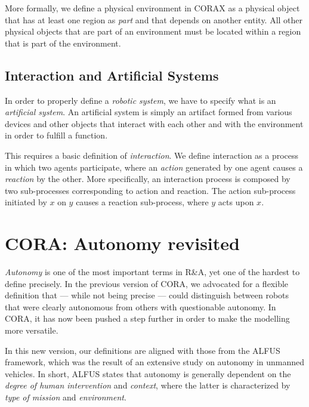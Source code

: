 \documentclass[preprint,12pt]{elsarticle}
\newcommand{\hlc}[2][yellow]{ {\sethlcolor{#1} \hl{#2}} }
\newcommand{\paulo}[1]{{\hlc[cyan]{\textbf{Paulo}: #1}}}
\begin{document}
More formally, we define a physical environment in CORAX as a physical object that has at least one region as \textit{part} and that depends on another entity. All other physical objects that are part of an environment must be located within a region that is part of the environment.

\subsection{Interaction and Artificial Systems}

In order to properly define a \emph{robotic system}, we have to specify what is an \emph{artificial system}. An artificial system is simply an artifact formed from various devices and other objects that interact with each other and with the environment in order to fulfill a function. 

This requires a basic definition of \emph{interaction}. We define interaction as a process in which two agents participate, where an \textit{action} generated by one agent causes a \textit{reaction} by the other. More specifically, an interaction process is composed by two sub-processes corresponding to action and reaction. The action sub-process initiated by $x$ on $y$ causes a reaction sub-process, where $y$ acts upon $x$.


\section{CORA: Autonomy revisited}


\textit{Autonomy} is one of the most important terms in R\&A, yet one of the hardest to  define precisely. In the previous version of CORA, we advocated for a flexible definition that --- while not being precise --- could distinguish between robots that were clearly autonomous from others with questionable autonomy. In CORA, it has now been pushed a step further in order to make the modelling more versatile. 

In this new version, our definitions are aligned with those from the ALFUS \cite{huang2003toward} framework, which was the result of an extensive study on autonomy in unmanned vehicles. In short, ALFUS states that autonomy is generally dependent on the \textit{degree of human intervention} and \textit{context}, where the latter is characterized by \textit{type of mission} and \textit{environment}. 
\end{document}
